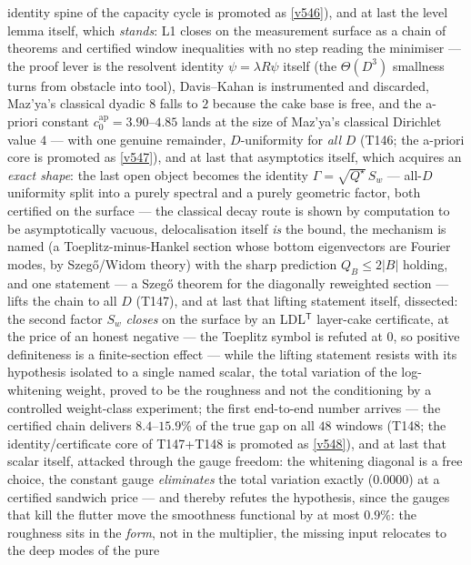 \documentclass[11pt,a4paper]{article}
\begin{document}
identity spine of the capacity cycle is promoted as \vref{v546}), and at last the level lemma
itself, which \emph{stands}: L1 closes on the measurement surface as a chain of theorems and
certified window inequalities with no step reading the minimiser --- the proof lever is the
resolvent identity $\psi=\lambda R\psi$ itself (the $\Theta(D^3)$ smallness turns from obstacle
into tool), Davis--Kahan is instrumented and discarded, Maz'ya's classical dyadic $8$ falls to
$2$ because the cake base is free, and the a-priori constant $c_0^{\mathrm{ap}}=3.90$--$4.85$
lands at the size of Maz'ya's classical Dirichlet value $4$ --- with one genuine remainder,
$D$-uniformity for \emph{all} $D$ (T146; the a-priori core is promoted as \vref{v547}), and at last
that asymptotics itself, which acquires an \emph{exact shape}: the last open object becomes the
identity $\Gamma=\sqrt{Q^\star}\,S_w$ --- all-$D$ uniformity split into a purely spectral and a
purely geometric factor, both certified on the surface --- the classical decay route is shown by
computation to be asymptotically vacuous, delocalisation itself \emph{is} the bound, the mechanism
is named (a Toeplitz-minus-Hankel section whose bottom eigenvectors are Fourier modes, by
Szeg\H{o}/Widom theory) with the sharp prediction $Q_B\le2|B|$ holding, and one statement --- a
Szeg\H{o} theorem for the diagonally reweighted section --- lifts the chain to all $D$ (T147), and
at last that lifting statement itself, dissected: the second factor $S_w$ \emph{closes} on the
surface by an LDL$^{\mathsf T}$ layer-cake certificate, at the price of an honest negative ---
the Toeplitz symbol is refuted at $0$, so positive definiteness is a finite-section effect ---
while the lifting statement resists with its hypothesis isolated to a single named scalar, the
total variation of the log-whitening weight, proved to be the roughness and not the conditioning
by a controlled weight-class experiment; the first end-to-end number arrives --- the certified
chain delivers $8.4$--$15.9\%$ of the true gap on all $48$ windows (T148; the
identity/certificate core of T147+T148 is promoted as \vref{v548}), and at last that scalar
itself, attacked through the gauge freedom: the whitening diagonal is a free choice, the
constant gauge \emph{eliminates} the total variation exactly ($0.0000$) at a certified
sandwich price --- and thereby refutes the hypothesis, since the gauges that kill the flutter
move the smoothness functional by at most $0.9\%$: the roughness sits in the \emph{form}, not
in the multiplier, the missing input relocates to the deep modes of the pure
\end{document}

